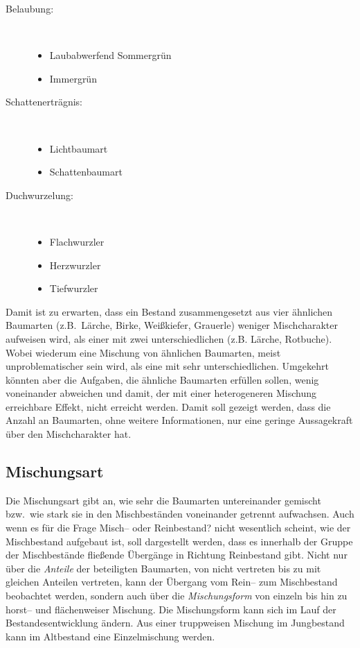 \documentclass[twocolumn]{scrartcl}
\begin{document}
\begin{description}
  \item[Belaubung:] ~
  \begin{itemize}
    \item Laubabwerfend Sommergrün
    \item Immergrün
  \end{itemize}
  \item[Schattenerträgnis:] ~
  \begin{itemize}
    \item Lichtbaumart
    \item Schattenbaumart
  \end{itemize}
  \item[Duchwurzelung:] ~
  \begin{itemize}
    \item Flachwurzler
    \item Herzwurzler
    \item Tiefwurzler
  \end{itemize}
\end{description}

Damit ist zu erwarten, dass ein Bestand zusammengesetzt aus vier ähnlichen
Baumarten (z.B.\ Lärche, Birke, Weißkiefer, Grauerle) weniger Mischcharakter
aufweisen wird, als einer mit zwei unterschiedlichen (z.B. Lärche, Rotbuche).
Wobei wiederum eine Mischung von ähnlichen Baumarten, meist unproblematischer
sein wird, als eine mit sehr unterschiedlichen. Umgekehrt könnten aber die
Aufgaben, die ähnliche Baumarten erfüllen sollen, wenig voneinander abweichen
und damit, der mit einer heterogeneren Mischung erreichbare Effekt, nicht
erreicht werden. Damit soll gezeigt werden, dass die Anzahl an Baumarten, ohne
weitere Informationen, nur eine geringe Aussagekraft über den Mischcharakter
hat.

\subsection{Mischungsart}
\label{ssec:mischugnsart}

Die Mischungsart gibt an, wie sehr die Baumarten untereinander gemischt bzw.\
wie stark sie in den Mischbeständen voneinander getrennt aufwachsen. Auch wenn
es für die Frage \glqq Misch-- oder Reinbestand?\grqq{} nicht wesentlich
scheint, wie der Mischbestand aufgebaut ist, soll dargestellt werden, dass es
innerhalb der Gruppe der Mischbestände fließende Übergänge in Richtung
Reinbestand gibt. Nicht nur über die \emph{Anteile} der beteiligten Baumarten,
von \glqq nicht vertreten\grqq{} bis zu \glqq mit gleichen Anteilen
vertreten\grqq{}, kann der Übergang vom Rein-- zum Mischbestand beobachtet
werden, sondern auch über die \emph{Mischungsform} von einzeln bis hin zu
horst-- und flächenweiser Mischung. Die Mischungsform kann sich im Lauf der
Bestandesentwicklung ändern. Aus einer truppweisen Mischung im Jungbestand kann
im Altbestand eine Einzelmischung werden.
\end{document}

